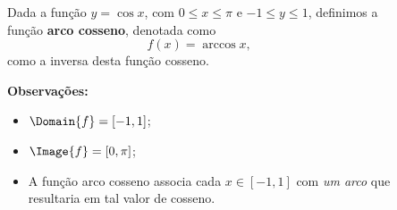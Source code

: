 \begin{frame}
  \begin{columns}[onlytextwidth]
    \begin{column}{0.49\textwidth}\vspace{-0.5cm}
      \begin{definition}
        Dada a função $y=\cos{x}$, com $0\leq x\leq \pi$ e $-1\leq y\leq 1$, definimos a função \textbf{arco cosseno}, denotada como
        \begin{equation*}
          f(x) = \arccos{x},
        \end{equation*}
        como a inversa desta função cosseno.
      \end{definition}
      \begin{highlight}
        \textbf{Observações:}
        \begin{itemize}
          \item $\Domain{f} = [-1,1]$;
          \item $\Image{f} = [0,\pi]$;
          \item A função arco cosseno associa cada $x\in[-1,1]$ com \emph{um arco} que resultaria em tal valor de cosseno.
        \end{itemize}
      \end{highlight}
    \end{column}
    \begin{column}{0.49\textwidth}\vspace*{-0.5cm}
      \begin{figure}
      \end{figure}
    \end{column}
  \end{columns}
\end{frame}

